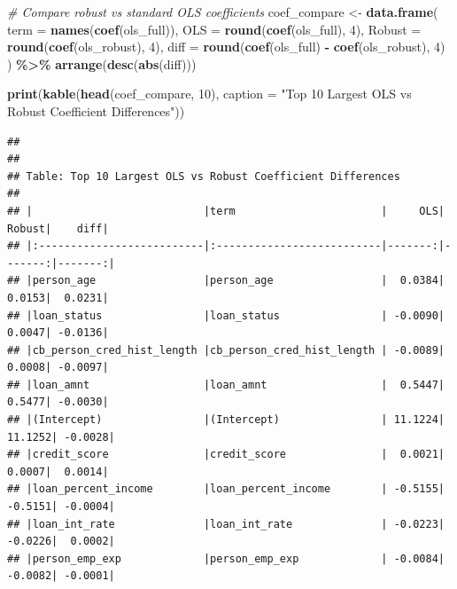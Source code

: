 \documentclass[
]{article}
\newenvironment{Shaded}{\begin{snugshade}}{\end{snugshade}}
\newcommand{\AttributeTok}[1]{\textcolor[rgb]{0.13,0.29,0.53}{#1}}
\newcommand{\CommentTok}[1]{\textcolor[rgb]{0.56,0.35,0.01}{\textit{#1}}}
\newcommand{\DecValTok}[1]{\textcolor[rgb]{0.00,0.00,0.81}{#1}}
\newcommand{\FunctionTok}[1]{\textcolor[rgb]{0.13,0.29,0.53}{\textbf{#1}}}
\newcommand{\NormalTok}[1]{#1}
\newcommand{\OtherTok}[1]{\textcolor[rgb]{0.56,0.35,0.01}{#1}}
\newcommand{\SpecialCharTok}[1]{\textcolor[rgb]{0.81,0.36,0.00}{\textbf{#1}}}
\newcommand{\StringTok}[1]{\textcolor[rgb]{0.31,0.60,0.02}{#1}}
\begin{document}
\begin{Shaded}
\begin{Highlighting}[]
\CommentTok{\# Compare robust vs standard OLS coefficients}
\NormalTok{coef\_compare }\OtherTok{\textless{}{-}} \FunctionTok{data.frame}\NormalTok{(}
  \AttributeTok{term    =} \FunctionTok{names}\NormalTok{(}\FunctionTok{coef}\NormalTok{(ols\_full)),}
  \AttributeTok{OLS     =} \FunctionTok{round}\NormalTok{(}\FunctionTok{coef}\NormalTok{(ols\_full), }\DecValTok{4}\NormalTok{),}
  \AttributeTok{Robust  =} \FunctionTok{round}\NormalTok{(}\FunctionTok{coef}\NormalTok{(ols\_robust), }\DecValTok{4}\NormalTok{),}
  \AttributeTok{diff    =} \FunctionTok{round}\NormalTok{(}\FunctionTok{coef}\NormalTok{(ols\_full) }\SpecialCharTok{{-}} \FunctionTok{coef}\NormalTok{(ols\_robust), }\DecValTok{4}\NormalTok{)}
\NormalTok{) }\SpecialCharTok{\%\textgreater{}\%} \FunctionTok{arrange}\NormalTok{(}\FunctionTok{desc}\NormalTok{(}\FunctionTok{abs}\NormalTok{(diff)))}

\FunctionTok{print}\NormalTok{(}\FunctionTok{kable}\NormalTok{(}\FunctionTok{head}\NormalTok{(coef\_compare, }\DecValTok{10}\NormalTok{),}
            \AttributeTok{caption =} \StringTok{"Top 10 Largest OLS vs Robust Coefficient Differences"}\NormalTok{))}
\end{Highlighting}
\end{Shaded}

\begin{verbatim}
## 
## 
## Table: Top 10 Largest OLS vs Robust Coefficient Differences
## 
## |                           |term                       |     OLS|  Robust|    diff|
## |:--------------------------|:--------------------------|-------:|-------:|-------:|
## |person_age                 |person_age                 |  0.0384|  0.0153|  0.0231|
## |loan_status                |loan_status                | -0.0090|  0.0047| -0.0136|
## |cb_person_cred_hist_length |cb_person_cred_hist_length | -0.0089|  0.0008| -0.0097|
## |loan_amnt                  |loan_amnt                  |  0.5447|  0.5477| -0.0030|
## |(Intercept)                |(Intercept)                | 11.1224| 11.1252| -0.0028|
## |credit_score               |credit_score               |  0.0021|  0.0007|  0.0014|
## |loan_percent_income        |loan_percent_income        | -0.5155| -0.5151| -0.0004|
## |loan_int_rate              |loan_int_rate              | -0.0223| -0.0226|  0.0002|
## |person_emp_exp             |person_emp_exp             | -0.0084| -0.0082| -0.0001|
\end{verbatim}
\end{document}
